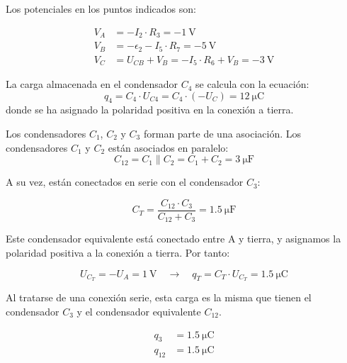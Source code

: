 \vspace{4mm}
Los potenciales en los puntos indicados son:

\vspace{-3mm}
\begin{align*}
  V_A &= -I_2 \cdot R_3 = \qty{-1}{\volt}\\
  V_B &= -\epsilon_2 - I_5 \cdot R_7 = \qty{-5}{\volt}\\
  V_C &= U_{CB} + V_B = -I_5 \cdot R_6 + V_B = \qty{-3}{\volt}
\end{align*}

\vspace{2mm}
La carga almacenada en el condensador $C_4$ se calcula con la ecuación:
\begin{equation*}
  q_4 = C_4 \cdot U_{C4} = C_4 \cdot (-U_C) = \qty{12}{\micro\coulomb}
\end{equation*}
donde se ha asignado la polaridad positiva en la conexión a tierra.

\vspace{4mm}
Los condensadores $C_1$, $C_2$ y $C_3$ forman parte de una asociación. Los condensadores $C_1$ y $C_2$ están asociados en paralelo:
\begin{equation*}
  C_{12} = C_1 \parallel C_2 = C_1 + C_2 = \qty{3}{\micro\farad}
\end{equation*}

\vspace{2mm}
A su vez, están conectados en serie con el condensador $C_3$:

\begin{equation*}
  C_T = \frac{C_{12} \cdot C_3}{C_{12} + C_3} = \qty{1.5}{\micro\farad}
\end{equation*}

\vspace{2mm}
Este condensador equivalente está conectado entre A y tierra, y asignamos la polaridad positiva a la conexión a tierra. Por tanto:

\vspace{-2mm}
\begin{equation*}
  U_{C_T} = -U_A = \qty{1}{\volt} \quad \rightarrow \quad q_T = C_T \cdot U_{C_T} = \qty{1.5}{\micro\coulomb}
\end{equation*}

\vspace{2mm}
Al tratarse de una conexión serie, esta carga es la misma que tienen el condensador $C_3$ y el condensador equivalente $C_{12}$.

\vspace{-7mm}
\begin{align*}
  q_3 &=  \boxed{\qty{1.5}{\micro\coulomb}}\\
  q_{12} &=  \qty{1.5}{\micro\coulomb}
\end{align*}

